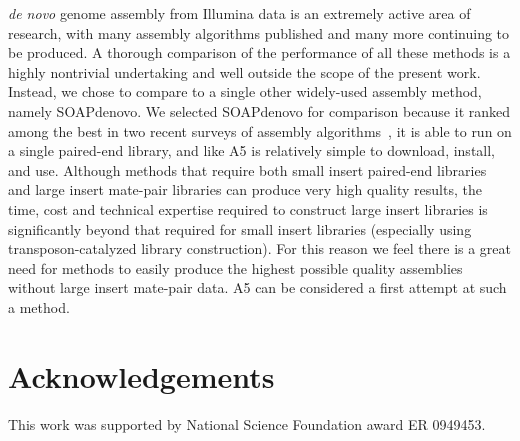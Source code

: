 \documentclass{bioinfo}
\begin{document}
\emph{de novo} genome assembly from Illumina data is an extremely active area of research, with many assembly algorithms published and many more continuing to be produced.
A thorough comparison of the performance of all these methods is a highly nontrivial undertaking and well outside the scope of the present  
work. Instead, we chose to compare to a single other widely-used assembly method, namely SOAPdenovo. We selected SOAPdenovo for comparison
because it ranked among the best in two recent surveys of assembly algorithms~\citep{Earl2011,Salzberg2011}, it is able to run on a single paired-end
library, and like A5 is relatively simple to download, install, and use. Although methods that require both small insert paired-end libraries
and large insert mate-pair libraries can produce very high quality results, the time, cost and technical expertise required to construct large insert
libraries is significantly beyond that required for small insert libraries (especially using transposon-catalyzed library construction).
For this reason we feel there is a great need for methods to easily produce the highest possible quality assemblies without large insert mate-pair data.
A5 can be considered a first attempt at such a method.

\section*{Acknowledgements}
This work was supported by National Science Foundation award ER 0949453.





\end{document}
